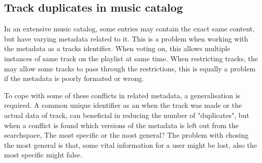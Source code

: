 \subsection{Track duplicates in music catalog}
\label{sec:duplicates}

In an extensive music catalog, some entries may contain the exact same content, but have varying metadata related to it. This is a problem when working with the metadata as a tracks identifier. When voting on, this allows multiple instances of same track on the playlist at same time. When restricting tracks, the may allow some tracks to pass through the restrictions, this is equally a problem if the metadata is poorly formated or wrong.

To cope with some of these conflicts in related metadata, a generalisation is required. A common unique identifier as an when the track was made or the actual data of track, can beneficial in reducing the number of "duplicates", but when a conflict is found which versions of the metadata is left out from the searchspace, The most specific or the most general? The problem with chosing the most general is that, some vital information for a user might be lost, also the most specific might false. 